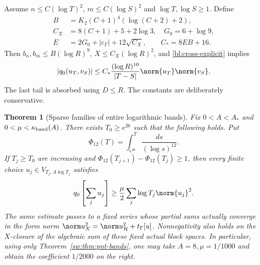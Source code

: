 \documentclass[11pt,a4paper]{article}
\numberwithin{equation}{section}
\newtheorem{theorem}{Theorem}[section]
\theoremstyle{definition}\newtheorem{definition}[theorem]{Definition}
\theoremstyle{remark}\newtheorem{remark}[theorem]{Remark}
\newcommand{\tg}{t_\Gamma}\newcommand{\cg}{c_\Gamma}
\begin{document}
Assume $n\le C(\log T)^2$, $m\le C(\log S)^2$ and $\log T,\log S\ge1$. Define
\begin{align}
 B&=K_2(C+1)^4(\log(C+2)+2),\\
 C_X&=8(C+1)+5+2\log3,\quad G_0=6+\log9,\\
 E&=2G_0+|c_\Gamma|+12\sqrt{C_X},\qquad C_*=8EB+16.
\end{align}
Then $b_n,b_m\le B(\log R)^9$, $X\le C_X(\log R)^2$, and \eqref{bl:cross-explicit} implies
\begin{equation}\label{bl:cross-simplified}
 |q_0(u_T,v_S)|\le C_*\frac{(\log R)^{10}}{|T-S|}\norm{u_T}\norm{v_S}.
\end{equation}
The last tail is absorbed using $D\le R$. The constants are deliberately conservative.

\begin{theorem}[Sparse families of entire logarithmic bands]\label{bl:sparsebands}
Fix $0<A<A_*$ and $0<\mu<\kappa_{\rm band}(A)$. There exists $T_0\ge e^{26}$ such that the following holds. Put
\begin{equation}
 \Phi_{12}(T)=\int_{e^{26}}^T\frac{ds}{(\log s)^{12}}.
\end{equation}
If $T_j\ge T_0$ are increasing and $\Phi_{12}(T_{j+1})-\Phi_{12}(T_j)\ge1$, then every finite choice $u_j\in V_{T_j,A\log T_j}$ satisfies
\begin{equation}\label{bl:sparse-result}
 q_0\left[\sum_j u_j\right]\ge\frac\mu2\sum_j\log T_j\norm{u_j}^2.
\end{equation}
The same estimate passes to a fixed series whose partial sums actually converge in the form norm
$\norm u_X^2=\norm u_{\mathcal H}^2+\tg[u]$. Nonnegativity also holds on the $X$-closure of the algebraic sum of these fixed actual block spaces. In particular, using only Theorem~\ref{sw:thm:pnt-bands}, one may take $A=8,\mu=1/1000$ and obtain the coefficient $1/2000$ on the right.
\end{theorem}
\end{document}
